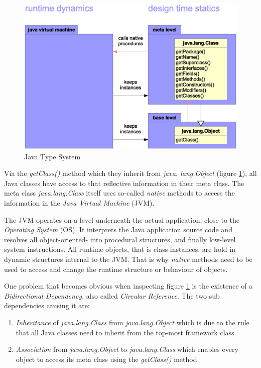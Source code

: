 \begin{figure}[ht]
    \begin{center}
        \includegraphics[scale=0.3]{vector/typesystem.eps}
        \caption{Java Type System}
        \label{typesystem_figure}
    \end{center}
\end{figure}

Via the \emph{getClass()} method which they inherit from \emph{java. lang.Object}
(figure \ref{typesystem_figure}), all Java classes have access to that reflective
information in their meta class. The meta class \emph{java.lang.Class} itself
uses so-called \emph{native} methods to access the information in the
\emph{Java Virtual Machine} (JVM).

The JVM operates on a level underneath the actual application, close to the
\emph{Operating System} (OS). It interprets the Java application source code and
resolves all object-oriented- into procedural structures, and finally low-level
system instructions. All runtime objects, that is class instances, are hold in
dynamic structures internal to the JVM. That is why \emph{native} methods need
to be used to access and change the runtime structure or behaviour of objects.

One problem that becomes obvious when inspecting figure \ref{typesystem_figure}
is the existence of a \emph{Bidirectional Dependency}, also called
\emph{Circular Reference}. The two sub dependencies causing it are:

\begin{enumerate}
    \item \emph{Inheritance} of \emph{java.lang.Class} from \emph{java.lang.Object}
        which is due to the rule that all Java classes need to inherit from the
        top-most framework class
    \item \emph{Association} from \emph{java.lang.Object} to \emph{java.lang.Class}
        which enables every object to access its meta class using the
        \emph{getClass()} method
\end{enumerate}

